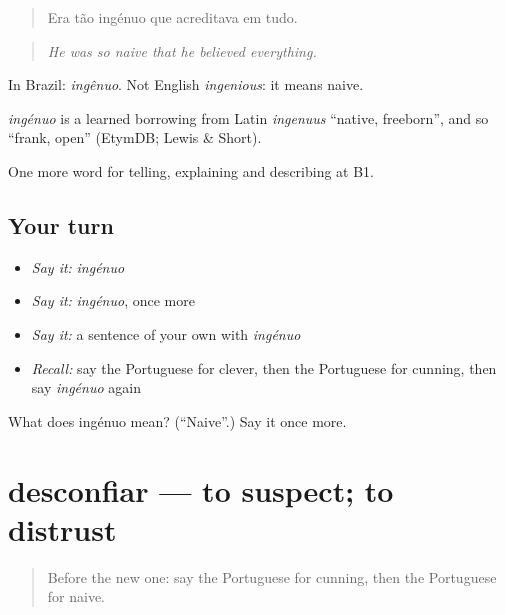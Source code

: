 \begin{quote}
Era tão ingénuo que acreditava em tudo.
\end{quote}

\begin{quote}
\emph{He was so naive that he believed everything.}
\end{quote}

In Brazil: \emph{ingênuo}. Not English \emph{ingenious}: it means naive.

\begin{cousinweb}
\emph{ingénuo} is a learned borrowing from Latin \emph{ingenuus} \textquotedblleft{}native, freeborn\textquotedblright{}, and so \textquotedblleft{}frank, open\textquotedblright{} (EtymDB; Lewis \& Short).
\end{cousinweb}

\begin{grammarlens}[title={What you've built}]
One more word for telling, explaining and describing at B1.
\end{grammarlens}

\subsection*{Your turn}
\begin{itemize}
\raggedright
  \item \emph{Say it:} \emph{ingénuo}
  \item \emph{Say it:} \emph{ingénuo}, once more
  \item \emph{Say it:} a sentence of your own with \emph{ingénuo}
  \item \emph{Recall:} say the Portuguese for clever, then the Portuguese for cunning, then say \emph{ingénuo} again
\end{itemize}

\begin{tcolorbox}[breakable,colback=teal!4,colframe=teal!35!black,title={Before you move on}]
What does ingénuo mean? (\textquotedblleft{}Naive\textquotedblright{}.) Say it once more.
\end{tcolorbox}
\section[desconfiar]{desconfiar — to suspect; to distrust}

\label{lesson:PT-C472-desconfiar}



\begin{quote}
Before the new one: say the Portuguese for cunning, then the Portuguese for naive.
\end{quote}

